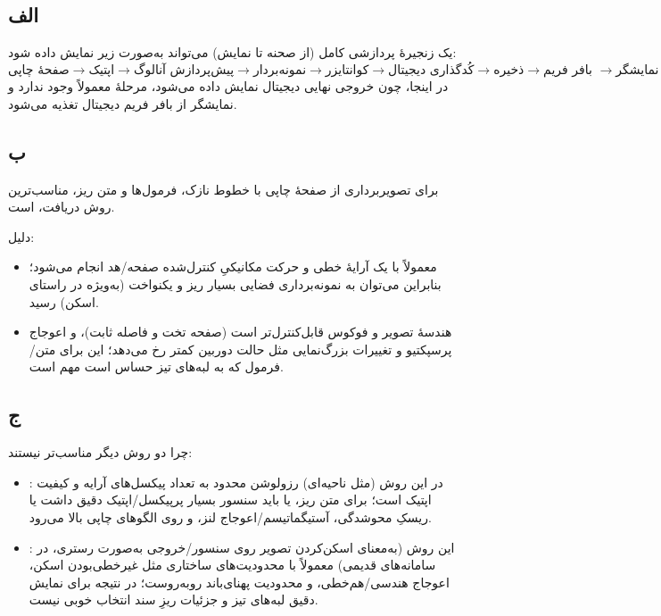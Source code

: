 \subsection*{الف}
یک زنجیرهٔ پردازشی کامل (از صحنه تا نمایش) می‌تواند به‌صورت زیر نمایش داده شود:
\[
\boxed{\text{صفحهٔ چاپی}} \rightarrow
\boxed{\text{اپتیک}} \rightarrow
\boxed{\text{پیش‌پردازش آنالوگ}} \rightarrow
\boxed{\text{نمونه‌بردار}} \rightarrow
\boxed{\text{کوانتایزر}} \rightarrow
\boxed{\text{کُدگذاری دیجیتال}} \rightarrow
\boxed{\text{ذخیره}} \rightarrow
\boxed{\text{بافر فریم }} \rightarrow
\boxed{\text{نمایشگر}}
\]
در اینجا، چون خروجی نهایی دیجیتال نمایش داده می‌شود، مرحلهٔ  معمولاً وجود ندارد و نمایشگر از بافر فریم دیجیتال تغذیه می‌شود.

\subsection*{ب}
برای تصویربرداری از صفحهٔ چاپی با خطوط نازک، فرمول‌ها و متن ریز، مناسب‌ترین روش دریافت،  است.

دلیل:
\begin{itemize}
    \item {} معمولاً با یک آرایهٔ خطی و حرکت مکانیکیِ کنترل‌شده صفحه/هد انجام می‌شود؛ بنابراین می‌توان به نمونه‌برداری فضایی بسیار ریز و یکنواخت (به‌ویژه در راستای اسکن) رسید.
    \item هندسهٔ تصویر و فوکوس قابل‌کنترل‌تر است (صفحه تخت و فاصله ثابت)، و اعوجاج پرسپکتیو و تغییرات بزرگ‌نمایی مثل حالت دوربین کمتر رخ می‌دهد؛ این برای متن/فرمول که به لبه‌های تیز حساس است مهم است.
\end{itemize}

\subsection*{ج}
چرا دو روش دیگر مناسب‌تر نیستند:
\begin{itemize}
    \item {}: در این روش (مثل  ناحیه‌ای) رزولوشن محدود به تعداد پیکسل‌های آرایه و کیفیت اپتیک است؛ برای متن ریز، یا باید سنسور بسیار پرپیکسل/اپتیک دقیق داشت یا ریسکِ محوشدگی، آستیگماتیسم/اعوجاج لنز، و  روی الگوهای چاپی بالا می‌رود.
    \item {}: این روش (به‌معنای اسکن‌کردن تصویر روی سنسور/خروجی به‌صورت رستری، در سامانه‌های قدیمی) معمولاً با محدودیت‌های ساختاری مثل غیرخطی‌بودن اسکن، اعوجاج هندسی/هم‌خطی، و محدودیت پهنای‌باند روبه‌روست؛ در نتیجه برای نمایش دقیق لبه‌های تیز و جزئیات ریزِ سند انتخاب خوبی نیست.
\end{itemize}

